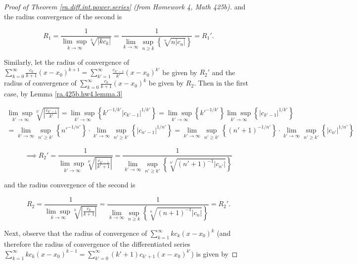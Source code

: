 \begin{proof}[Proof of Theorem \ref{ra.diff.int.power.series} (from Homework 4, Math 425b)]
and the radius convergence of the second is

\[
R_1 =  \frac{1}{\underset{k \to \infty}{\lim \sup} \sqrt[k]{|k c_k|}} = \frac{1}{ \lim_{k \to \infty} \sup_{n \geq k} \left\{ \sqrt[n]{n | c_{n}|} \right\} } = R_1'.
\]



Similarly, let the radius of convergence of \(\sum_{k=0}^\infty \frac{c_k}{k+1}(x - x_0)^{k+1} = \sum_{k'=1}^\infty \frac{c_{k'-1}}{k'}(x - x_0)^{k'}\) be given by \(R_2'\) and the radius of convergence of \(\sum_{k=0}^\infty \frac{c_k}{k+1} (x - x_0)^k\) be given by \(R_2\). Then in the first case, by Lemma \ref{ra.425b.hw4.lemma.3}


\begin{multline*}
\underset{k' \to \infty}{\lim \sup}  \sqrt[k']{ \left|\frac{c_{k'-1}}{k'} \right|} = \underset{k' \to \infty}{\lim \sup} \left\{ {k'}^{-1/k'} |c_{k' - 1} |^{1/k'}  \right\} = \underset{k' \to \infty}{\lim \sup} \left\{ {k'}^{-1/k'} \right\}  \underset{k' \to \infty}{\lim \sup} \left\{  |c_{k' - 1} |^{1/k'}  \right\}
\\ = \lim_{k' \to \infty} \sup_{n' \geq k'} \left\{ {n'}^{-1/n'}  \right\} \cdot \lim_{k' \to \infty} \sup_{n' \geq k'} \left\{  |c_{n' - 1} |^{1/n'} \right\} = \lim_{k' \to \infty} \sup_{n' \geq k'} \left\{ {(n' + 1)} ^{-1/n'}  \right\} \cdot \lim_{k' \to \infty} \sup_{n' \geq k'} \left\{  |c_{n' } |^{1/n'} \right\}
\end{multline*}




\[
\implies R_2' = \frac{1}{\underset{k' \to \infty}{\lim \sup} \sqrt[k']{| \frac{c_{k'-1}}{k' + 1}|}} = \frac{1}{ \lim_{k' \to \infty} \sup_{n' \geq k'} \left\{ \sqrt[n']{(n'+1)^{-1} | c_{n'}|} \right\} }
\]



and the radius convergence of the second is

\[
R_2 =  \frac{1}{\underset{k \to \infty}{\lim \sup} \sqrt[k]{\left| \frac{c_k}{k + 1} \right|}} = \frac{1}{ \lim_{k \to \infty} \sup_{n \geq k} \left\{ \sqrt[n]{(n+1)^{-1} | c_{n}|} \right\} } = R_2'.
\]





Next, observe that the radius of convergence of \(\sum_{k=1}^{\infty} kc_k (x-x_0)^{k}\) (and therefore the radius of convergence of the differentiated series \(\sum_{k=1}^{\infty} kc_k (x-x_0)^{k-1}= \sum_{k'=0}^{\infty} (k' + 1)c_{k' + 1} (x-x_0)^{k'}\)) is given by 


\end{proof}

